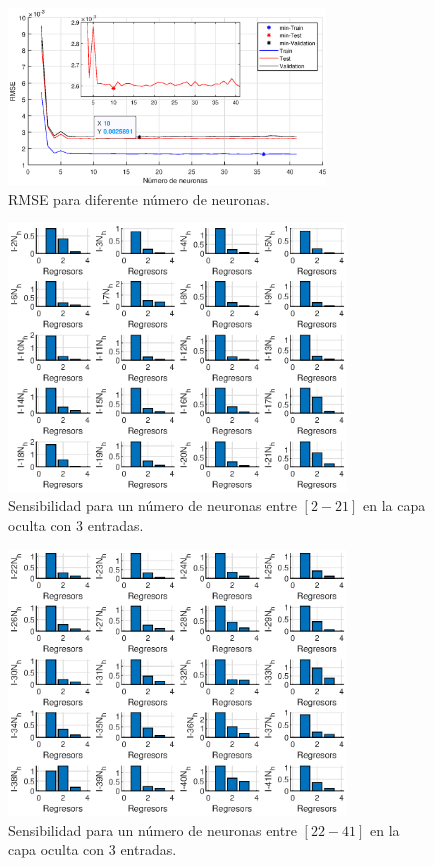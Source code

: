 \documentclass[12pt]{article}
\begin{document}
\begin{itemize}
	\begin{figure}[h!]
		\centering
		\captionsetup{justification=centering}
		 \includegraphics[width=0.75\textwidth]{imag/redes/RMSE_full_3.eps}
		\caption{RMSE para diferente número de neuronas.}
		\label{rmse_3}
	\end{figure}
	\begin{figure}[h!]
		\centering
		\captionsetup{justification=centering}
		\includegraphics[width=0.8\textwidth, height=0.45\textheight]{imag/redes/sensibilidad_full_1_3.eps}
		\caption{Sensibilidad para un número de neuronas entre $[2-21]$ en la capa oculta con 3 entradas.}
		\label{sensi_red_1_3}
	\end{figure}
	\begin{figure}[h!]
		\centering
		\captionsetup{justification=centering}
		\includegraphics[width=0.8\textwidth, height=0.45\textheight]{imag/redes/sensibilidad_full_2_3.eps}
		\caption{Sensibilidad para un número de neuronas entre $[22-41]$ en la capa oculta con 3 entradas.}
		\label{sensi_red_2_3}
	\end{figure}
\end{itemize}
\end{document}

